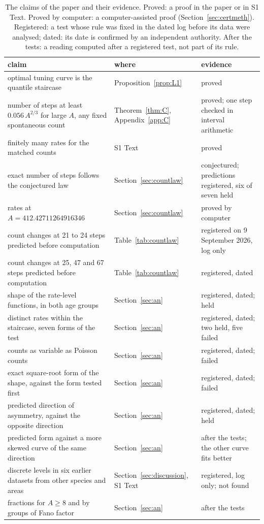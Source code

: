 \begin{table}[tp]
\caption{The claims of the paper and their evidence. Proved: a proof in the paper or in S1 Text. Proved by computer: a computer-assisted
proof (Section~\ref{sec:certmeth}). Registered: a test whose rule was fixed in the dated log before its data were analysed; dated:
its date is confirmed by an independent authority. After the tests: a reading computed after a registered test, not part of its rule.}\label{tab:evidence}
\centering
\small
\begin{tabular}{>{\raggedright\arraybackslash}p{6.2cm}>{\raggedright\arraybackslash}p{3.0cm}>{\raggedright\arraybackslash}p{4.4cm}}
\hline
claim & where & evidence\\
\hline
optimal tuning curve is the quantile staircase & Proposition~\ref{prop:L1} & proved\\
number of steps at least $0.056\,A^{2/3}$ for large $A$, any fixed spontaneous count & Theorem~\ref{thm:C}, Appendix~\ref{app:C} & proved; one step checked
in interval arithmetic\\
finitely many rates for the matched counts & S1 Text & proved\\
exact number of steps follows the conjectured law & Section~\ref{sec:countlaw} & conjectured; predictions registered, six of seven held\\
24 rates at $A=412.42711264916346$ & Section~\ref{sec:countlaw} & proved by computer\\
count changes at 21 to 24 steps predicted before computation & Table~\ref{tab:countlaw} & registered on 9 September 2026, log only\\
count changes at 25, 47 and 67 steps predicted before computation & Table~\ref{tab:countlaw} & registered, dated\\
shape of the rate-level functions, in both age groups & Section~\ref{sec:an} & registered, dated; held\\
distinct rates within the staircase, seven forms of the test & Section~\ref{sec:an} & registered, dated; two held, five failed\\
counts as variable as Poisson counts & Section~\ref{sec:an} & registered, dated; failed\\
exact square-root form of the shape, against the form tested first & Section~\ref{sec:an} & registered, dated; failed\\
predicted direction of asymmetry, against the opposite direction & Section~\ref{sec:an} & registered, dated; held\\
predicted form against a more skewed curve of the same direction & Section~\ref{sec:an} & after the tests; the other curve fits better\\
discrete levels in six earlier datasets from other species and areas & Section~\ref{sec:discussion}, S1 Text & registered, log only; not found\\
fractions for $A\ge8$ and by groups of Fano factor & Section~\ref{sec:an} & after the tests\\
\hline
\end{tabular}
\end{table}
